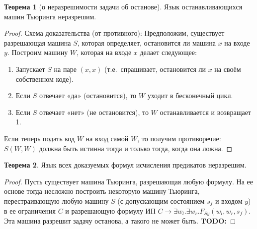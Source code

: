 \documentclass[a4paper,11pt]{article}
\theoremstyle{definition}
\newtheorem*{thm}{Теорема}
\newcommand{\todo}[1]{\textbf{TODO:} #1}
\begin{document}
\begin{thm}[о неразрешимости задачи об останове]
Язык останавливающихся машин Тьюринга неразрешим.
\end{thm}
\begin{proof}
Схема доказательства (от противного): Предположим, существует разрешающая машина
$S$, которая определяет, остановится ли машина $x$ на входе $y$. Построим машину
$W$, которая на входе $x$ делает следующее:
\begin{enumerate}
\item Запускает $S$ на паре $(x, x)$ (т.е.\ спрашивает, остановится ли $x$ на
  своём собственном коде).
\item Если $S$ отвечает «да» (остановится), то $W$ уходит в бесконечный цикл.
\item Если $S$ отвечает «нет» (не остановится), то $W$ останавливается и
  возвращает 1.
\end{enumerate}
Если теперь подать код $W$ на вход самой $W$, то получим противоречие: $S(W,
W)$ должна быть истинна тогда и только тогда, когда она ложна.
\end{proof}

\begin{thm}
Язык всех доказуемых формул исчисления предикатов неразрешим.
\end{thm}
\begin{proof}
Пусть существует машина Тьюринга, разрешающая любую формулу. На ее основе тогда
несложно построить некоторую машину Тьюринга, перестраивающую любую машину $S$ (с
допускающим состоянием $s_f$ и входом $y$) в ее ограничения $C$ и разрешающую
формулу ИП $C \to \exists w_l.\exists w_r.F_{S y}(w_l, w_r, s_f)$. Эта машина
разрешит задачу останова, а такого не может быть. \todo{}
\end{proof}
\end{document}

